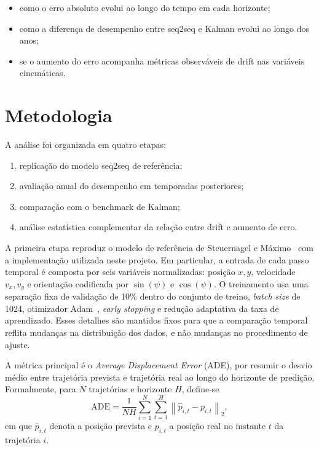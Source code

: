 \documentclass[runningheads]{llncs}
\begin{document}
\begin{itemize}
    \item como o erro absoluto evolui ao longo do tempo em cada horizonte;
    \item como a diferen\c{c}a de desempenho entre seq2seq e Kalman evolui ao longo dos anos;
    \item se o aumento do erro acompanha m\'etricas observ\'aveis de drift nas vari\'aveis cinem\'aticas.
\end{itemize}

\section{Metodologia}

A an\'alise foi organizada em quatro etapas:

\begin{enumerate}
    \item replica\c{c}\~ao do modelo seq2seq de refer\^encia;
    \item avalia\c{c}\~ao anual do desempenho em temporadas posteriores;
    \item compara\c{c}\~ao com o benchmark de Kalman;
    \item an\'alise estat\'istica complementar da rela\c{c}\~ao entre drift e aumento de erro.
\end{enumerate}

A primeira etapa reproduz o modelo de refer\^encia de Steuernagel e M\'aximo~\cite{seq2seq} com a implementa\c{c}\~ao utilizada neste projeto. Em particular, a entrada de cada passo temporal \'e composta por seis vari\'aveis normalizadas: posi\c{c}\~ao \(x,y\), velocidade \(v_x,v_y\) e orienta\c{c}\~ao codificada por \(\sin(\psi)\) e \(\cos(\psi)\). O treinamento usa uma separa\c{c}\~ao fixa de valida\c{c}\~ao de 10\% dentro do conjunto de treino, \textit{batch size} de 1024, otimizador Adam~\cite{adam}, \textit{early stopping} e redu\c{c}\~ao adaptativa da taxa de aprendizado. Esses detalhes s\~ao mantidos fixos para que a compara\c{c}\~ao temporal reflita mudan\c{c}as na distribui\c{c}\~ao dos dados, e n\~ao mudan\c{c}as no procedimento de ajuste.

A m\'etrica principal \'e o \textit{Average Displacement Error} (ADE), por resumir o desvio m\'edio entre trajet\'oria prevista e trajet\'oria real ao longo do horizonte de predi\c{c}\~ao. Formalmente, para \(N\) trajet\'orias e horizonte \(H\), define-se
\begin{equation}\label{eq:ade}
\mathrm{ADE} = \frac{1}{NH} \sum_{i=1}^{N}\sum_{t=1}^{H} \left\lVert \hat{p}_{i,t} - p_{i,t} \right\rVert_2,
\end{equation}
em que \(\hat{p}_{i,t}\) denota a posi\c{c}\~ao prevista e \(p_{i,t}\) a posi\c{c}\~ao real no instante \(t\) da trajet\'oria \(i\).
\end{document}

